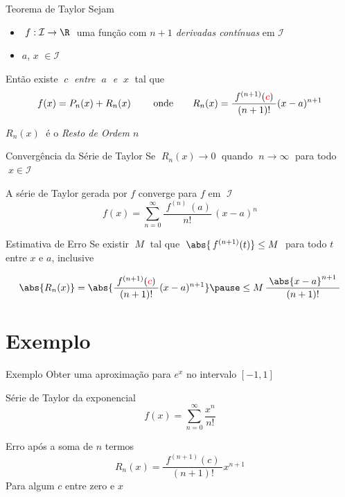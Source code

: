 \begin{frame}{Teorema de Taylor}
  Sejam
  \begin{itemize}
  \item $\;f:\mathcal{I}\rightarrow \R\;$ uma função com \emph{$n+1$ derivadas contínuas} em $\mathcal{I}$
  \item $a$, $x$ $\in\mathcal{I}$
  \end{itemize}

  \pause
  \vspace{\baselineskip}
  Então existe {\color{red}$\;c\;$} \emph{entre $\;a\;$ e $\;x\;$} \pause tal que
  \[
    f(x)=P_n(x)+R_n(x)\
    \qquad \text{onde} \qquad
    R_n(x)=\frac{\;f^{(n+1)}({\color{red}c})\;}{(n+1)!}(x-a)^{n+1}
  \]

  \vspace{.5\baselineskip}
  $R_n(x)\;$ é o \emph{Resto de Ordem $n$}
\end{frame}

\begin{frame}{Convergência da Série de Taylor}
Se \emph{\(\;R_n(x)\to 0\;\)} quando \emph{\(\;n\to\infty\;\)}
para todo \(\;x\in\mathcal{I}\;\)

\vspace{\baselineskip}
A série de Taylor gerada por $f$ converge para $f$ em \(\;\mathcal{I}\;\)
\[
  f(x) = \sum_{n=0}^\infty \frac{\;f^{(n)\;}(a)}{n!}\,(x-a)^n
\]
\end{frame}

\begin{frame}{Estimativa de Erro}
Se existir \(\;M\;\) tal que  \emph{\(\;\abs{\,f^{(n+1)}(t)} \leq M \;\)}
para todo $t$ entre $x$ e $a$, inclusive

\pause
\vspace{\baselineskip}
\[
  \abs{R_n(x)}
  = \abs{\frac{\;f^{(n+1)}({\color{red}c})\;}{(n+1)!}(x-a)^{n+1}} \pause
  \leq M\, \frac{\;\abs{x-a}^{n+1}\;}{(n+1)!}
\]
\end{frame}

\section{Exemplo}

\begin{frame}{Exemplo}
   Obter uma aproximação para \(e^x\) no intervalo \([-1, 1]\)

   \vspace{0.5\baselineskip}
   \pause
   Série de Taylor da exponencial
   \[
     f(x) = \sum_{n=0}^\infty \frac{x^n}{n!}
   \]

   \pause
   Erro após a soma de $n$ termos
   \[
     R_n(x)=\frac{\;f^{(n+1)}(c)\;}{(n+1)!}x^{n+1}
   \]
   Para algum $c$ entre zero e $x$
\end{frame}

